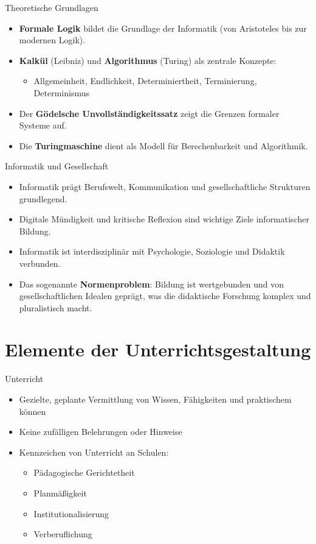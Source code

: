 \documentclass{article}
\begin{document}
\begin{block}{Theoretische Grundlagen}
    \begin{itemize}
        \item \textbf{Formale Logik} bildet die Grundlage der Informatik (von Aristoteles bis zur modernen Logik).
        \item \textbf{Kalkül} (Leibniz) und \textbf{Algorithmus} (Turing) als zentrale Konzepte:
        \begin{itemize}
            \item Allgemeinheit, Endlichkeit, Determiniertheit, Terminierung, Determinismus
        \end{itemize}
        \item Der \textbf{Gödelsche Unvollständigkeitssatz} zeigt die Grenzen formaler Systeme auf.
        \item Die \textbf{Turingmaschine} dient als Modell für Berechenbarkeit und Algorithmik.
    \end{itemize}
\end{block}

\begin{block}{Informatik und Gesellschaft}
    \begin{itemize}
        \item Informatik prägt Berufswelt, Kommunikation und gesellschaftliche Strukturen grundlegend.
        \item Digitale Mündigkeit und kritische Reflexion sind wichtige Ziele informatischer Bildung.
        \item Informatik ist interdisziplinär mit Psychologie, Soziologie und Didaktik verbunden.
        \item Das sogenannte \textbf{Normenproblem}: Bildung ist wertgebunden und von gesellschaftlichen Idealen geprägt, was die didaktische Forschung komplex und pluralistisch macht.
    \end{itemize}
\end{block}

\section{Elemente der Unterrichtsgestaltung}
\begin{block}{Unterricht}
    \begin{itemize}
        \item Gezielte, geplante Vermittlung von Wissen, Fähigkeiten und praktischem können
        \item Keine zufälligen Belehrungen oder Hinweise
        \item Kennzeichen von Unterricht an Schulen:
        \begin{itemize}
            \item Pädagogische Gerichtetheit
            \item Planmäßigkeit
            \item Institutionalisierung
            \item Verberuflichung
        \end{itemize}
    \end{itemize}
\end{block}
\end{document}
